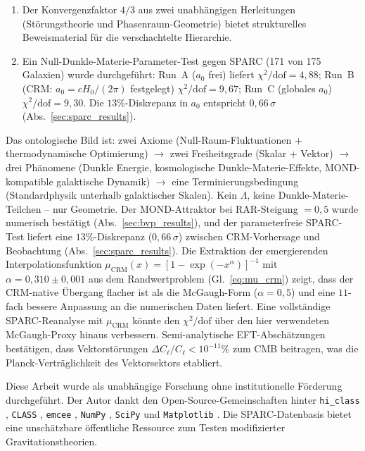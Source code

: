 \documentclass[aps,prd,twocolumn,superscriptaddress,nofootinbib]{revtex4-2}
\begin{document}
\begin{enumerate}
\item Der Konvergenzfaktor $4/3$ aus zwei unabh\"angigen Herleitungen (St\"orungstheorie und Phasenraum-Geometrie) bietet strukturelles Beweismaterial f\"ur die verschachtelte Hierarchie.

\item Ein Null-Dunkle-Materie-Parameter-Test gegen SPARC (171 von 175 Galaxien) wurde durchgef\"uhrt: Run~A ($a_0$ frei) liefert $\chi^2/\mathrm{dof} = 4{,}88$; Run~B (CRM: $a_0 = cH_0/(2\pi)$ festgelegt) $\chi^2/\mathrm{dof} = 9{,}67$; Run~C (globales $a_0$) $\chi^2/\mathrm{dof} = 9{,}30$. Die $13\%$-Diskrepanz in $a_0$ entspricht $0{,}66\,\sigma$ (Abs.~\ref{sec:sparc_results}).
\end{enumerate}

Das ontologische Bild ist: zwei Axiome (Null-Raum-Fluktuationen + thermodynamische Optimierung) $\to$ zwei Freiheitsgrade (Skalar + Vektor) $\to$ drei Ph\"anomene (Dunkle Energie, kosmologische Dunkle-Materie-Effekte, MOND-kompatible galaktische Dynamik) $\to$ eine Terminierungsbedingung (Standardphysik unterhalb galaktischer Skalen). Kein $\Lambda$, keine Dunkle-Materie-Teilchen -- nur Geometrie. Der MOND-Attraktor bei RAR-Steigung $= 0{,}5$ wurde numerisch best\"atigt (Abs.~\ref{sec:bvp_results}), und der parameterfreie SPARC-Test liefert eine $13\%$-Diskrepanz ($0{,}66\,\sigma$) zwischen CRM-Vorhersage und Beobachtung (Abs.~\ref{sec:sparc_results}). Die Extraktion der emergierenden Interpolationsfunktion $\mu_{\mathrm{CRM}}(x) = [1 - \exp(-x^\alpha)]^{-1}$ mit $\alpha = 0{,}310 \pm 0{,}001$ aus dem Randwertproblem (Gl.~\ref{eq:mu_crm}) zeigt, dass der CRM-native \"Ubergang flacher ist als die McGaugh-Form ($\alpha = 0{,}5$) und eine $11$-fach bessere Anpassung an die numerischen Daten liefert. Eine vollst\"andige SPARC-Reanalyse mit $\mu_{\mathrm{CRM}}$ k\"onnte den $\chi^2/\mathrm{dof}$ \"uber den hier verwendeten McGaugh-Proxy hinaus verbessern. Semi-analytische EFT-Absch\"atzungen best\"atigen, dass Vektorst\"orungen $\Delta C_\ell/C_\ell < 10^{-11}\%$ zum CMB beitragen, was die Planck-Vertr\"aglichkeit des Vektorsektors etabliert.


\begin{acknowledgments}
Diese Arbeit wurde als unabh\"angige Forschung ohne institutionelle F\"orderung durchgef\"uhrt. Der Autor dankt den Open-Source-Gemeinschaften hinter \texttt{hi\_class} \cite{Zumalacarregui2017}, \texttt{CLASS} \cite{Blas2011}, \texttt{emcee} \cite{ForemanMackey2013}, \texttt{NumPy} \cite{Harris2020}, \texttt{SciPy} \cite{Virtanen2020} und \texttt{Matplotlib} \cite{Hunter2007}. Die SPARC-Datenbasis \cite{Lelli2016} bietet eine unsch\"atzbare \"offentliche Ressource zum Testen modifizierter Gravitationstheorien.
\end{acknowledgments}
\end{document}
